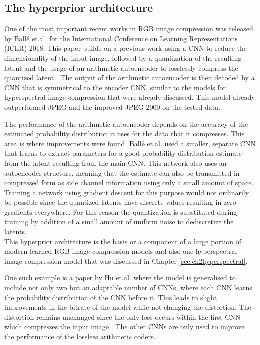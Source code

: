 \subsection{The hyperprior architecture}
One of the most important recent works in RGB image compression was released by Ballé et.al. \citep{balle_variational_2018} for the International Conference on Learning Representations (ICLR) 2018. This paper builds on a previous work using a CNN to reduce the dimensionality of the input image, followed by a quantization of the resulting latent and the usage of an arithmetic autoencoder to losslessly compress the quantized latent \citep{balle_end--end_2017}. The output of the arithmetic autoencoder is then decoded by a CNN that is symmetrical to the encoder CNN, similar to the models for hyperspectral image compression that were already discussed. This model already outperformed JPEG and the improved JPEG 2000 on the tested data.

The performance of the arithmetic autoencoder depends on the accuracy of the estimated probability distribution it uses for the data that it compresses. This area is where improvements were found. Ballé et.al. used a smaller, separate CNN that learns to extract parameters for a good probability distribution estimate from the latent resulting from the main CNN. This network also uses an autoencoder structure, meaning that the estimate can also be transmitted in compressed form as side channel information using only a small amount of space. Training a network using gradient descent for this purpose would not ordinarily be possible since the quantized latents have discrete values resulting in zero gradients everywhere. For this reason the quantization is substituted during training by addition of a small amount of uniform noise to dediscretize the latents.\\
This hyperprior architecture is the basis or a component of a large portion of modern learned RGB image compression models and also one hyperspectral image compression model that was discussed in Chapter \ref{sec:ch2hyperspectral}.

One such example is a paper by Hu et.al. \citep{hu_coarse--fine_2020} where the model is generalised to include not only two but an adaptable number of CNNs, where each CNN learns the probability distribution of the CNN before it. This leads to slight improvements in the bitrate of the model while not changing the distortion. The distortion remains unchanged since the only loss occurs within the first CNN which compresses the input image . The other CNNs are only used to improve the performance of the lossless arithmetic coders.

